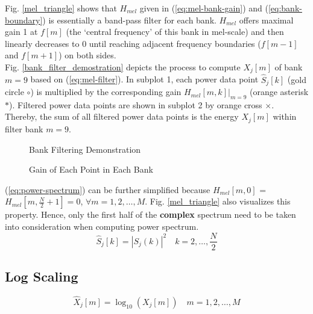 Fig. \ref{mel_triangle} shows that $H_{mel}$ given in (\ref{eq:mel-bank-gain}) and (\ref{eq:bank-boundary}) is essentially a band-pass filter for each bank. $H_{mel}$ offers maximal gain 1 at $f[m]$ (the `central frequency' of this bank in mel-scale) and then linearly decreases to 0 until reaching adjacent frequency boundaries ($f[m-1]$ and $f[m+1]$) on both sides.\\

Fig. \ref{bank_filter_demostration} depicts the process to compute $X_j[m]$ of bank $m = 9$ based on (\ref{eq:mel-filter}). In subplot 1, each power data point $\hat{S}_j[k]$ (\textcolor{gold_matlab}{gold circle $\circ$}) is multiplied by the corresponding gain $H_{mel}[m, k]|_{m=9}$ (\textcolor{orange_matlab}{orange asterisk $*$}). Filtered power data points are shown in subplot 2 by \textcolor{orange_matlab}{orange cross $\times$}. Thereby, the sum of all filtered power data points is the energy $X_j[m]$ within filter bank $m = 9$.

\begin{figure}[H]
\begin{minipage}[t]{0.5\linewidth}
\centering
{}
\caption{Bank Filtering Demonstration}
\label{bank_filter_demostration}
\end{minipage}
\begin{minipage}[t]{0.5\linewidth}
\centering
{}
\caption{Gain of Each Point in Each Bank}
\label{mel_filter_bank_gain}
\end{minipage}
\end{figure}

(\ref{eq:power-spectrum}) can be further simplified because $H_{mel}[m, 0]$ = $H_{mel}[m, \frac{N}{2}+1] = 0$, $\forall m = 1, 2, \dots, M$. Fig. \ref{mel_triangle} also visualizes this property. Hence, only the first half of the \textbf{complex} spectrum need to be taken into consideration when computing power spectrum.
\begin{equation}
\hat{S}_j[k] = |S_j(k)|^2 \quad k = 2, \dots, \frac{N}{2}
\end{equation}


\subsection{Log Scaling}

\begin{equation}
\label{eq:log-scaling}
\hat{X}_j[m] = \log_{10}(X_j[m]) \quad m = 1, 2, \dots, M
\end{equation}

